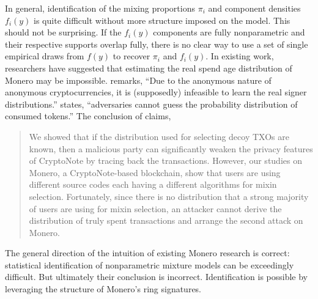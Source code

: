 \documentclass[english]{article}
\begin{document}
In general, identification of the mixing proportions $\pi_{i}$ and
component densities $f_{i}(y)$ is quite difficult without more structure
imposed on the model. This should not be surprising. If the $f_{i}(y)$
components are fully nonparametric and their respective supports overlap
fully, there is no clear way to use a set of single empirical draws
from $f(y)$ to recover $\pi_{i}$ and $f_{i}(y)$. In existing work,
researchers have suggested that estimating the real spend age distribution
of Monero may be impossible. \cite{Ronge2021} remarks, ``Due to
the anonymous nature of anonymous cryptocurrencies, it is (supposedly)
infeasible to learn the real signer distributions.'' \cite{Ni2021}
states, ``adversaries cannot guess the probability distribution of
consumed tokens.'' The conclusion of \cite{Aeeneh2021} claims,
\begin{quote}
We showed that if the distribution used for selecting decoy TXOs are
known, then a malicious party can significantly weaken the privacy
features of CryptoNote by tracing back the transactions. However,
our studies on Monero, a CryptoNote-based blockchain, show that users
are using different source codes each having a different algorithms
for mixin selection. Fortunately, since there is no distribution that
a strong majority of users are using for mixin selection, an attacker
cannot derive the distribution of truly spent transactions and arrange
the second attack on Monero.
\end{quote}
The general direction of the intuition of existing Monero research
is correct: statistical identification of nonparametric mixture models
can be exceedingly difficult. But ultimately their conclusion is incorrect.
Identification is possible by leveraging the structure of Monero's
ring signatures.
\end{document}
